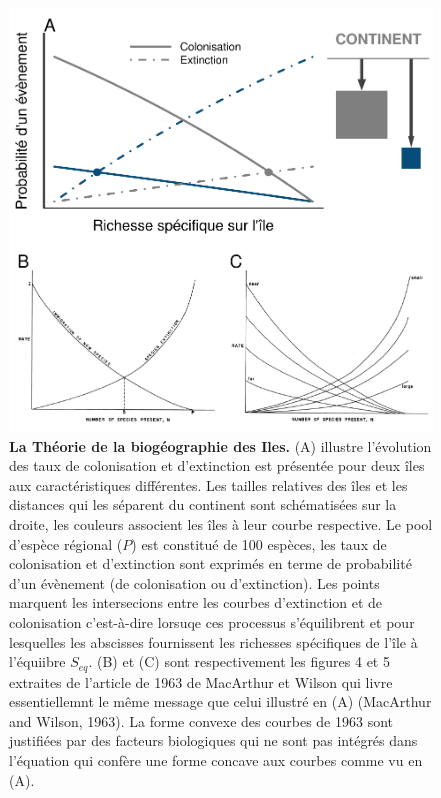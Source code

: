 \begin{figure}[htbp]
\centering
\includegraphics{fig/fig1.pdf}
\caption{\textbf{La Théorie de la biogéographie des Iles.} (A) illustre
l'évolution des taux de colonisation et d'extinction est présentée pour
deux îles aux caractéristiques différentes. Les tailles relatives des
îles et les distances qui les séparent du continent sont schématisées
sur la droite, les couleurs associent les îles à leur courbe respective.
Le pool d'espèce régional (\(P\)) est constitué de 100 espèces, les taux
de colonisation et d'extinction sont exprimés en terme de probabilité
d'un évènement (de colonisation ou d'extinction). Les points marquent
les intersecions entre les courbes d'extinction et de colonisation
c'est-à-dire lorsuqe ces processus s'équilibrent et pour lesquelles les
abscisses fournissent les richesses spécifiques de l'île à l'équiibre
\(S_{eq}\). (B) et (C) sont respectivement les figures 4 et 5 extraites
de l'article de 1963 de MacArthur et Wilson qui livre essentiellemnt le
même message que celui illustré en (A) (MacArthur and Wilson, 1963). La
forme convexe des courbes de 1963 sont justifiées par des facteurs
biologiques qui ne sont pas intégrés dans l'équation \label{eqMW} qui
confère une forme concave aux courbes comme vu en (A).\label{fig:figMW}}
\end{figure}

